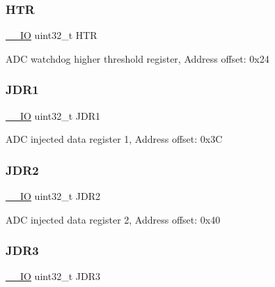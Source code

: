 \subsubsection{\texorpdfstring{H\+TR}{HTR}}
{\footnotesize\ttfamily \mbox{\hyperlink{core__sc300_8h_aec43007d9998a0a0e01faede4133d6be}{\+\_\+\+\_\+\+IO}} uint32\+\_\+t H\+TR}

A\+DC watchdog higher threshold register, Address offset\+: 0x24 \mbox{\label{struct_a_d_c___type_def_a22fa21352be442bd02f9c26a1013d598}} 
\subsubsection{\texorpdfstring{J\+D\+R1}{JDR1}}
{\footnotesize\ttfamily \mbox{\hyperlink{core__sc300_8h_aec43007d9998a0a0e01faede4133d6be}{\+\_\+\+\_\+\+IO}} uint32\+\_\+t J\+D\+R1}

A\+DC injected data register 1, Address offset\+: 0x3C \mbox{\label{struct_a_d_c___type_def_ae9156af81694b7a85923348be45a2167}} 
\subsubsection{\texorpdfstring{J\+D\+R2}{JDR2}}
{\footnotesize\ttfamily \mbox{\hyperlink{core__sc300_8h_aec43007d9998a0a0e01faede4133d6be}{\+\_\+\+\_\+\+IO}} uint32\+\_\+t J\+D\+R2}

A\+DC injected data register 2, Address offset\+: 0x40 \mbox{\label{struct_a_d_c___type_def_a3a54028253a75a470fccf841178cba46}} 
\subsubsection{\texorpdfstring{J\+D\+R3}{JDR3}}
{\footnotesize\ttfamily \mbox{\hyperlink{core__sc300_8h_aec43007d9998a0a0e01faede4133d6be}{\+\_\+\+\_\+\+IO}} uint32\+\_\+t J\+D\+R3}

